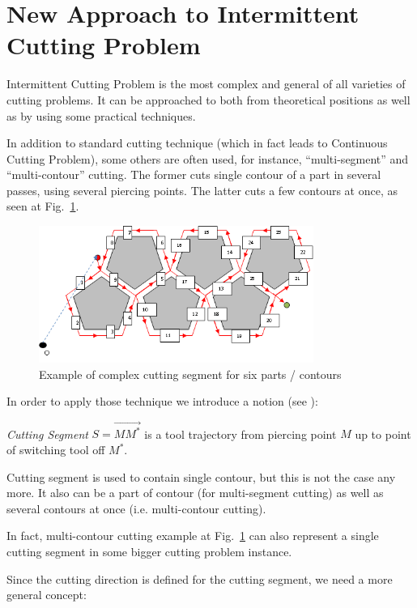 \documentclass[]{llncs}
\begin{document}
\section{New Approach to Intermittent Cutting Problem}

Intermittent Cutting Problem
is the most complex and general
of all varieties of cutting problems.
It can be approached to
both from theoretical positions
as well as by using some practical techniques.

In addition to standard cutting technique
(which in fact leads to
Continuous Cutting Problem),
some others are often used,
for instance,
``multi-segment'' and
``multi-contour'' cutting.
The former cuts single contour of a part
in several passes,
using several piercing points.
The latter cuts a few contours
at once,
as seen at
Fig.~\ref{fig:6x5}.

\begin{figure}
  \centering
  \includegraphics[width=0.8\textwidth]{pentagons.png}
  \caption{Example of complex cutting segment for six parts / contours}
  \label{fig:6x5}
\end{figure}

In order to apply those technique
we introduce a notion
(see \cite{bib:petunin-2019}):

{\it Cutting Segment}
$S = \overrightarrow{M M^*}$
is a tool trajectory from piercing point $M$
up to point of switching tool off $M^*$.

Cutting segment is used to contain single contour,
but this is not the case any more.
It also can be a part of contour
(for multi-segment cutting)
as well as several contours at once
(i.e. multi-contour cutting).

In fact,
multi-contour cutting example
at Fig.~\ref{fig:6x5}
can also represent a single
cutting segment
in some bigger cutting problem instance.

Since the cutting direction is defined for the cutting segment,
we need a more general concept:
\end{document}
